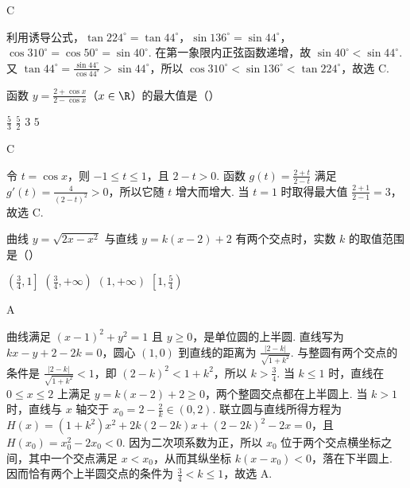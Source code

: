 \documentclass[UTF8,a4paper,oneside,11pt]{ctexbook}
\begin{document}
\begin{answer}
C
\end{answer}

\begin{solution}
利用诱导公式，\(\tan224^\circ=\tan44^\circ\)，\(\sin136^\circ=\sin44^\circ\)，\(\cos310^\circ=\cos50^\circ=\sin40^\circ\). 在第一象限内正弦函数递增，故 \(\sin40^\circ<\sin44^\circ\). 又 \(\tan44^\circ=\frac{\sin44^\circ}{\cos44^\circ}>\sin44^\circ\)，所以 \(\cos310^\circ<\sin136^\circ<\tan224^\circ\)，故选 C.
\end{solution}

\begin{problem}
函数 \(y = \frac{2 + \cos x}{2 - \cos x}\)（\(x \in \R\)）的最大值是（\quad）

\choices
    {\(\frac{5}{3}\)}
    {\(\frac{5}{2}\)}
    {\(3\)}
    {\(5\)}
\end{problem}

\begin{answer}
C
\end{answer}

\begin{solution}
令 \(t=\cos x\)，则 \(-1\leqslant t\leqslant1\)，且 \(2-t>0\). 函数 \(g(t)=\frac{2+t}{2-t}\) 满足 \(g'(t)=\frac4{(2-t)^2}>0\)，所以它随 \(t\) 增大而增大. 当 \(t=1\) 时取得最大值 \(\frac{2+1}{2-1}=3\)，故选 C.
\end{solution}

\begin{problem}
曲线 \(y = \sqrt{2x - x^2}\) 与直线 \(y = k(x - 2) + 2\) 有两个交点时，实数 \(k\) 的取值范围是（\quad）

\choices
    {\(\left(\frac{3}{4},1\right]\)}
    {\(\left(\frac{3}{4},+\infty\right)\)}
    {\((1,+\infty)\)}
    {\(\left[1,\frac{5}{4}\right)\)}
\end{problem}

\begin{answer}
A
\end{answer}

\begin{solution}
曲线满足 \((x-1)^2+y^2=1\) 且 \(y\geqslant0\)，是单位圆的上半圆. 直线写为 \(kx-y+2-2k=0\)，圆心 \((1,0)\) 到直线的距离为 \(\frac{|2-k|}{\sqrt{1+k^2}}\). 与整圆有两个交点的条件是 \(\frac{|2-k|}{\sqrt{1+k^2}}<1\)，即 \((2-k)^2<1+k^2\)，所以 \(k>\frac34\). 当 \(k\leqslant1\) 时，直线在 \(0\leqslant x\leqslant2\) 上满足 \(y=k(x-2)+2\geqslant0\)，两个整圆交点都在上半圆上. 当 \(k>1\) 时，直线与 \(x\) 轴交于 \(x_0=2-\frac2k\in(0,2)\). 联立圆与直线所得方程为 \(H(x)=(1+k^2)x^2+2k(2-2k)x+(2-2k)^2-2x=0\)，且 \(H(x_0)=x_0^2-2x_0<0\). 因为二次项系数为正，所以 \(x_0\) 位于两个交点横坐标之间，其中一个交点满足 \(x<x_0\)，从而其纵坐标 \(k(x-x_0)<0\)，落在下半圆上. 因而恰有两个上半圆交点的条件为 \(\frac34<k\leqslant1\)，故选 A.
\end{solution}
\end{document}
